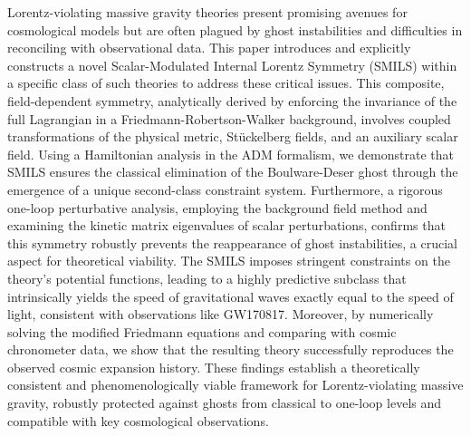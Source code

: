\documentclass[twocolumn]{aastex631}
\begin{document}
Lorentz-violating massive gravity theories present promising avenues for cosmological models but are often plagued by ghost instabilities and difficulties in reconciling with observational data. This paper introduces and explicitly constructs a novel Scalar-Modulated Internal Lorentz Symmetry (SMILS) within a specific class of such theories to address these critical issues. This composite, field-dependent symmetry, analytically derived by enforcing the invariance of the full Lagrangian in a Friedmann-Robertson-Walker background, involves coupled transformations of the physical metric, Stückelberg fields, and an auxiliary scalar field. Using a Hamiltonian analysis in the ADM formalism, we demonstrate that SMILS ensures the classical elimination of the Boulware-Deser ghost through the emergence of a unique second-class constraint system. Furthermore, a rigorous one-loop perturbative analysis, employing the background field method and examining the kinetic matrix eigenvalues of scalar perturbations, confirms that this symmetry robustly prevents the reappearance of ghost instabilities, a crucial aspect for theoretical viability. The SMILS imposes stringent constraints on the theory's potential functions, leading to a highly predictive subclass that intrinsically yields the speed of gravitational waves exactly equal to the speed of light, consistent with observations like GW170817. Moreover, by numerically solving the modified Friedmann equations and comparing with cosmic chronometer data, we show that the resulting theory successfully reproduces the observed cosmic expansion history. These findings establish a theoretically consistent and phenomenologically viable framework for Lorentz-violating massive gravity, robustly protected against ghosts from classical to one-loop levels and compatible with key cosmological observations.
\end{document}
